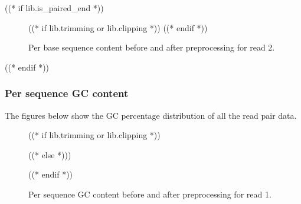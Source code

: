 ((* if lib.is_paired_end *))
    \begin{figure}[h!]
        \centering
        \begin{minipage}[b]{0.48\textwidth}
            \centering
        \end{minipage}
        \begin{minipage}[b]{0.48\textwidth}
            \centering
            ((* if lib.trimming or lib.clipping *))
            ((* endif *))
        \end{minipage}
        \caption{Per base sequence content before and after preprocessing for read 2.}
    \end{figure}
((* endif *))


\subsubsection{Per sequence GC content}
    The figures below show the GC percentage distribution of all the read pair
    data.
    \begin{figure}[h!]
        \centering
        ((* if lib.trimming or lib.clipping *))
        \begin{minipage}[b]{0.48\textwidth}
            \centering
        \end{minipage}
        \begin{minipage}[b]{0.48\textwidth}
            \centering
        \end{minipage}
        ((* else *)))
        \begin{minipage}[b]{0.48\textwidth}
            \centering
        \end{minipage}
        ((* endif *))
        \caption{Per sequence GC content before and after preprocessing for read 1.}
    \end{figure}

